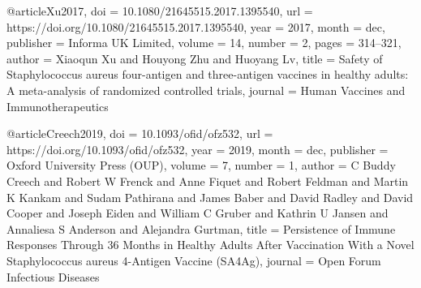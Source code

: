 @article{Xu2017,
  doi = {10.1080/21645515.2017.1395540},
  url = {https://doi.org/10.1080/21645515.2017.1395540},
  year = {2017},
  month = dec,
  publisher = {Informa {UK} Limited},
  volume = {14},
  number = {2},
  pages = {314--321},
  author = {Xiaoqun Xu and Houyong Zhu and Huoyang Lv},
  title = {Safety of Staphylococcus aureus four-antigen and three-antigen vaccines in healthy adults: A meta-analysis of randomized controlled trials},
  journal = {Human Vaccines and Immunotherapeutics}
}

@article{Creech2019,
  doi = {10.1093/ofid/ofz532},
  url = {https://doi.org/10.1093/ofid/ofz532},
  year = {2019},
  month = dec,
  publisher = {Oxford University Press ({OUP})},
  volume = {7},
  number = {1},
  author = {C Buddy Creech and Robert W Frenck and Anne Fiquet and Robert Feldman and Martin K Kankam and Sudam Pathirana and James Baber and David Radley and David Cooper and Joseph Eiden and William C Gruber and Kathrin U Jansen and Annaliesa S Anderson and Alejandra Gurtman},
  title = {Persistence of Immune Responses Through 36 Months in Healthy Adults After Vaccination With a Novel Staphylococcus aureus 4-Antigen Vaccine ({SA}4Ag)},
  journal = {Open Forum Infectious Diseases}
}


